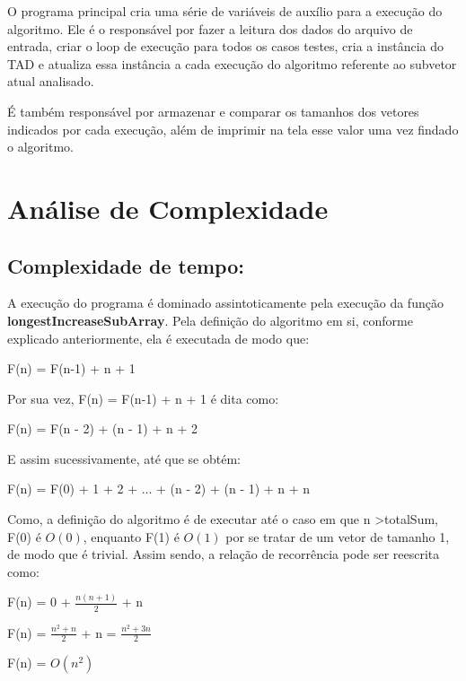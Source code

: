 \documentclass[12pt]{article}
\begin{document}
    \par O programa principal cria uma série de variáveis de auxílio para a execução do algoritmo. Ele é o responsável por fazer a leitura dos dados do arquivo de entrada, criar o loop de execução para todos os casos testes, cria a instância do TAD e atualiza essa instância a cada execução do algoritmo referente ao subvetor atual analisado.
    \par É também responsável por armazenar e comparar os tamanhos dos vetores indicados por cada execução, além de imprimir na tela esse valor uma vez findado o algoritmo.



\section{Análise de Complexidade}
\subsection {Complexidade de tempo:}
    \par A execução do programa é dominado assintoticamente pela execução da função \textbf{longestIncreaseSubArray}. Pela definição do algoritmo em si, conforme explicado anteriormente, ela é executada de modo que:
    \par {\begin{center} F(n) = F(n-1) + n + 1\end{center}}
    \par Por sua vez, F(n) = F(n-1) + n + 1 é dita como:
    \par {\begin{center} F(n) = F(n - 2) + (n - 1) + n + 2 \end{center}}
    \par E assim sucessivamente, até que se obtém:
    {\begin{center}
        F(n) = F(0) + 1 + 2 + ... + (n - 2) + (n - 1) + n + n
    \end{center}}
    \par Como, a definição do algoritmo é de executar até o caso em que n \textgreater\space totalSum, F(0) é $O(0)$, enquanto F(1) é $O(1)$ por se tratar de um vetor de tamanho 1, de modo que é trivial. Assim sendo, a relação de recorrência pode ser reescrita como:
    {\begin{center}
    F(n) = 0 + $\frac{n(n + 1)}{2}$ + n
\par F(n) = $\frac{n^2 + n}{2}$ + n = $\frac{n^2 + 3n}{2}$
\par F(n) = $O(n^2)$
    \end{center}}
    
\end{document}
